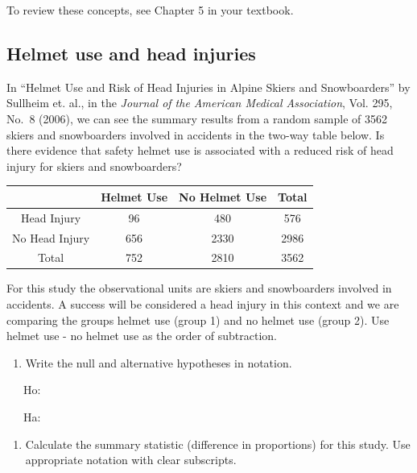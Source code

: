 \documentclass[
]{report}
\providecommand{\tightlist}{%
  \setlength{\itemsep}{0pt}\setlength{\parskip}{0pt}}
\begin{document}
To review these concepts, see Chapter 5 in your textbook.

\hypertarget{helmet-use-and-head-injuries}{%
\subsection{Helmet use and head injuries}\label{helmet-use-and-head-injuries}}

In ``Helmet Use and Risk of Head Injuries in Alpine Skiers and Snowboarders'' by Sullheim et. al., in the \emph{Journal of the American Medical Association}, Vol. 295, No.~8 (2006), we can see the summary results from a random sample of 3562 skiers and snowboarders involved in accidents in the two-way table below. Is there evidence that safety helmet use is associated with a reduced risk of head injury for skiers and snowboarders?

\begin{longtable}[]{@{}cccc@{}}
\toprule
& Helmet Use & No Helmet Use & Total \\
\midrule
\endhead
Head Injury & 96 & 480 & 576 \\
No Head Injury & 656 & 2330 & 2986 \\
Total & 752 & 2810 & 3562 \\
\bottomrule
\end{longtable}

For this study the observational units are skiers and snowboarders involved in accidents. A success will be considered a head injury in this context and we are comparing the groups helmet use (group 1) and no helmet use (group 2). Use helmet use - no helmet use as the order of subtraction.

\newpage

\begin{enumerate}
\def\labelenumi{\arabic{enumi}.}
\tightlist
\item
  Write the null and alternative hypotheses in notation.
\end{enumerate}

~~~Ho:

\vspace{0.2in}

~~~Ha:

\vspace{0.2in}

\begin{enumerate}
\def\labelenumi{\arabic{enumi}.}
\setcounter{enumi}{1}
\tightlist
\item
  Calculate the summary statistic (difference in proportions) for this study. Use appropriate notation with clear subscripts.
\end{enumerate}
\end{document}
